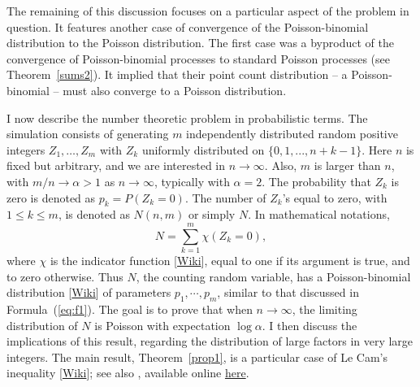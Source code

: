 \documentclass[10pt]{article}
\begin{document}
The remaining of this discussion focuses on a particular aspect of the problem in question. It features another case of convergence of the \textcolor{index}{Poisson-binomial distribution}  to the
\textcolor{index}{Poisson distribution}. The first case was a byproduct of
the convergence of \textcolor{index}{Poisson-binomial processes} to standard
\textcolor{index}{Poisson processes} (see Theorem~\ref{sums2}). It implied that  their point count distribution -- a Poisson-binomial -- must also converge to a Poisson distribution.  \\


\noindent I now describe the number theoretic problem in probabilistic terms. The simulation consists of generating $m$ independently distributed random positive integers $Z_1,\dots, Z_m$ with $Z_k$ uniformly distributed on $\{0,1,...,n+k-1\}$. Here $n$ is fixed but arbitrary, and we are interested in $n\rightarrow\infty$. Also, $m$ is larger than $n$, with $m/n \rightarrow \alpha > 1$ as $n\rightarrow\infty$, typically with $\alpha=2$. The probability that $Z_k$ is zero is denoted as $p_k=P(Z_k=0)$. The number of $Z_k$'s equal to zero, with $1\leq k \leq m$, is denoted as $N(n,m)$ or simply $N$. In mathematical notations,
\begin{equation}
  N = \sum_{k=1}^m \chi(Z_k =0), \label{plp}
\end{equation}
where $\chi$ is the indicator function [\href{https://en.wikipedia.org/wiki/Indicator_function}{Wiki}], equal to one if its argument is true, and to zero otherwise.
Thus $N$, the counting random variable, has a
Poisson-binomial distribution [\href{https://en.wikipedia.org/wiki/Poisson_binomial_distribution}{Wiki}] of parameters $p_1,\cdots,p_m$, similar to that discussed
in Formula~(\ref{eq:f1}). The goal is to prove that when $n\rightarrow\infty$, the limiting distribution of $N$ is Poisson with expectation $\log \alpha$. I then discuss the implications of this result, regarding the distribution of large factors in very large integers. The main result, Theorem~\ref{prop1}, is a particular case of \textcolor{index}{Le Cam's inequality} [\href{https://en.wikipedia.org/wiki/Le_Cam's_theorem}{Wiki}]; see also \cite{lecam}, available online
\href{http://www-stat.wharton.upenn.edu/~steele/Papers/PDF/LIaPA.pdf}{here}.  \\
\end{document}
